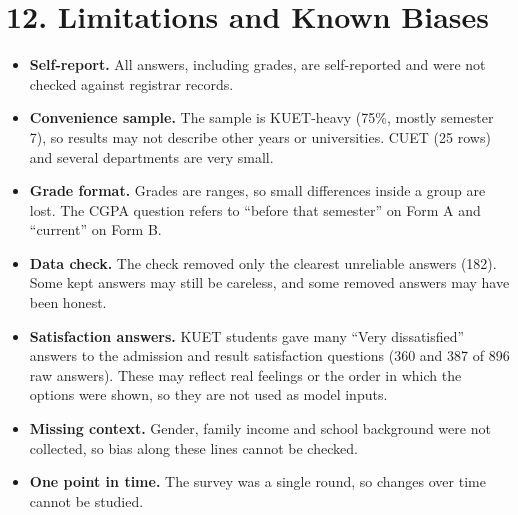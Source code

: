 \documentclass[11pt,a4paper]{article}
\begin{document}
\section{12. Limitations and Known Biases}
\begin{itemize}
\item \textbf{Self-report.} All answers, including grades, are self-reported and were not checked against registrar records.
\item \textbf{Convenience sample.} The sample is KUET-heavy (75\%, mostly semester 7), so results may not describe other years or universities. CUET (25 rows) and several departments are very small.
\item \textbf{Grade format.} Grades are ranges, so small differences inside a group are lost. The CGPA question refers to ``before that semester'' on Form A and ``current'' on Form B.
\item \textbf{Data check.} The check removed only the clearest unreliable answers (182). Some kept answers may still be careless, and some removed answers may have been honest.
\item \textbf{Satisfaction answers.} KUET students gave many ``Very dissatisfied'' answers to the admission and result satisfaction questions (360 and 387 of 896 raw answers). These may reflect real feelings or the order in which the options were shown, so they are not used as model inputs.
\item \textbf{Missing context.} Gender, family income and school background were not collected, so bias along these lines cannot be checked.
\item \textbf{One point in time.} The survey was a single round, so changes over time cannot be studied.
\end{itemize}

\end{document}
